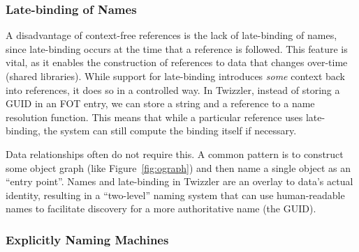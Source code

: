 

\subsubsection{Late-binding of Names}
\label{sec:latebinding}

A disadvantage of context-free references is the lack of late-binding of names,
since late-binding occurs at the time that a reference is followed. This feature
is vital, as it enables the construction of references to data that changes
over-time (\eg shared libraries). While support for late-binding
introduces \emph{some} context back into references, it does so in a controlled way. In Twizzler,
instead of storing a GUID in an FOT entry, we can store a string and a reference
to a name resolution function.
This means
that while a particular reference uses late-binding, the system can still compute the binding itself
if necessary.

Data relationships often do not require this.
A common pattern is to construct some object graph (like
Figure~\ref{fig:ograph}) and then name a single object as an ``entry point''.
Names and late-binding in Twizzler are an overlay to data's actual
identity, resulting in a ``two-level'' naming system that can use human-readable names to facilitate
discovery for a more authoritative name (the GUID).




\subsubsection{Explicitly Naming Machines}
\label{sec:name_machines}

